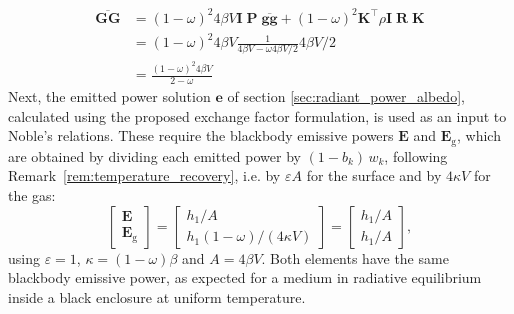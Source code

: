 \documentclass[preprint,1p,times]{elsarticle}
\theoremstyle{plain}
\theoremstyle{definition}
\theoremstyle{remark}
\begin{document}
\begin{equation}
\begin{split}
	\overline{\mathbf{GG}} &= (1-\omega)^2 4\beta V \mathbf{I}\;\mathbf{P}\; \overline{\mathbf{gg}} + (1-\omega)^2 \mathbf{K}^\top \rho\mathbf{I}\; \mathbf{R}\;\mathbf{K}\\ &= (1-\omega)^2 4\beta V \frac{1}{4\beta V - \omega 4\beta V/2 } 4\beta V/2 \\
	&= \frac{(1-\omega)^2 4\beta V}{2 - \omega }
\end{split}
	\label{eq:GG}
\end{equation}
Next, the emitted power solution $\mathbf{e}$ of section \ref{sec:radiant_power_albedo}, calculated using the proposed exchange factor formulation, is used as an input to Noble's relations. These require the blackbody emissive powers $\mathbf{E}$ and $\mathbf{E}_\mathrm{g}$, which are obtained by dividing each emitted power by $(1-b_k)\,w_k$, following Remark~\ref{rem:temperature_recovery}, i.e. by $\varepsilon A$ for the surface and by $4\kappa V$ for the gas:
\begin{equation}
	\begin{bmatrix}
	\mathbf{E} \\
	\mathbf{E}_\mathrm{g}
	\end{bmatrix} = 
	\begin{bmatrix}
	h_1/A \\
	h_1(1-\omega)/(4\kappa V)
	\end{bmatrix} =
	\begin{bmatrix}
	h_1/A \\
	h_1/A
	\end{bmatrix},
\end{equation}
using $\varepsilon = 1$, $\kappa = (1-\omega)\beta$ and $A = 4\beta V$. Both elements have the same blackbody emissive power, as expected for a medium in radiative equilibrium inside a black enclosure at uniform temperature.
\end{document}
